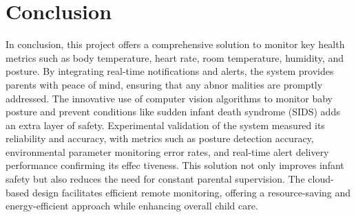 \documentclass[conference]{IEEEtran}
\begin{document}
\section{Conclusion}
In conclusion, this project offers a comprehensive solution to monitor key
health metrics such as body temperature, heart rate, room temperature,
humidity, and posture. By integrating real-time notifications and alerts,
the system provides parents with peace of mind, ensuring that any abnor
malities are promptly addressed. The innovative use of computer vision
algorithms to monitor baby posture and prevent conditions like sudden
infant death syndrome (SIDS) adds an extra layer of safety. Experimental
validation of the system measured its reliability and accuracy, with metrics
such as posture detection accuracy, environmental parameter monitoring
error rates, and real-time alert delivery performance confirming its effec
tiveness. This solution not only improves infant safety but also reduces the
need for constant parental supervision. The cloud-based design facilitates
efficient remote monitoring, offering a resource-saving and energy-efficient
approach while enhancing overall child care.
\end{document}
